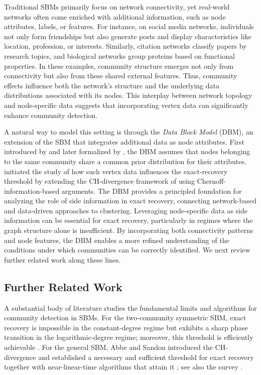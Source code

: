 \documentclass[11pt]{article}
\theoremstyle{plain}
\theoremstyle{definition}
\begin{document}
Traditional SBMs primarily focus on network connectivity, yet real-world networks often come enriched with additional information, such as node attributes, labels, or features. For instance, on social media networks, individuals not only form friendships but also generate posts and display characteristics like location, profession, or interests. Similarly, citation networks classify papers by research topics, and biological networks group proteins based on functional properties. In these examples, community structure emerges not only from connectivity but also from these shared external features. Thus, community effects influence both the network's structure and the underlying data distributions associated with its nodes. This interplay between network topology and node-specific data suggests that incorporating vertex data can significantly enhance community detection. 

A natural way to model this setting is through the \emph{Data Block Model} (DBM), an extension of the SBM that integrates additional data as node attributes. First introduced by \citet{abbe2016graph} and later formalized by \citet{asadi2017compressing}, the DBM assumes that nodes belonging to the same community share a common prior distribution for their attributes. \citet{asadi2017compressing} initiated the study of how such vertex data influences the exact-recovery threshold by extending the CH-divergence framework of \citet{abbe015} using Chernoff-information-based arguments. The DBM provides a principled foundation for analyzing the role of side information in exact recovery, connecting network-based and data-driven approaches to clustering. Leveraging node-specific data as side information can be essential for exact recovery, particularly in regimes where the graph structure alone is insufficient. By incorporating both connectivity patterns and node features, the DBM enables a more refined understanding of the conditions under which communities can be correctly identified. We next review further related work along these lines.




\subsection{Further Related Work}
A substantial body of literature studies the fundamental limits and algorithms for community detection in SBMs. For the two-community symmetric SBM, exact recovery is impossible in the constant-degree regime but exhibits a sharp phase transition in the logarithmic-degree regime; moreover, this threshold is efficiently achievable \citep{ABH16,mossel2016consistency}. For the general SBM, Abbe and Sandon introduced the CH-divergence and established a necessary and sufficient threshold for exact recovery together with near-linear-time algorithms that attain it \citep{abbe015,abbe2015recovering}; see also the survey \citep{abbe017}.
\end{document}
